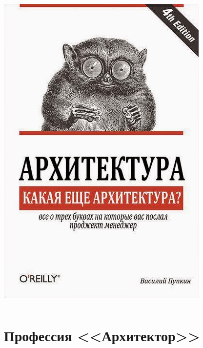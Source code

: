 \documentclass[xetex,mathserif,serif]{beamer}
\begin{document}
\begin{frame}
\begin{columns}
\begin{column}{0.3\textwidth}
                \includegraphics[width=\textwidth]{whatArchitecture.png}
            \end{column}
        \end{columns}
    \end{frame}

    \section{Профессия <<Архитектор>>}
\end{document}
